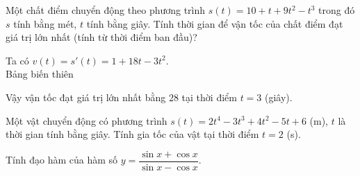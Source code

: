 \begin{bt}%
Một chất điểm chuyển động theo phương trình $s \left(t \right)=10+t+9t^2-t^3$ trong đó $s$ tính bằng mét, $t$ tính bằng giây. Tính thời gian để vận tốc của chất điểm đạt giá trị lớn nhất (tính từ thời điểm ban đầu)?
\loigiai
{
Ta có $v(t)=s'(t)=1+18t-3t^2$.\\
Bảng biến thiên
\begin{center}
\end{center}
Vậy vận tốc đạt giá trị lớn nhất bằng $28$ tại thời điểm $t=3$ (giây).
}
\end{bt}

\begin{bt}%
Một vật chuyển động có phương trình $s(t)=2t^4-3t^3+4t^2-5t+6$ (m), $t$ là thời gian tính bằng giây. Tính gia tốc của vật tại thời điểm $t=2$ (s).
\end{bt}

\begin{bt}%
Tính đạo hàm của hàm số $y=\dfrac{\sin x+\cos x}{\sin x-\cos x}$.
\end{bt}

